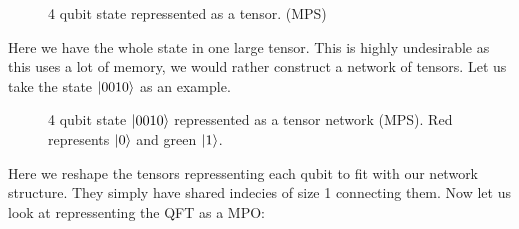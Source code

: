 \begin{figure}[H]
    \centering 
    \caption{4 qubit state repressented as a tensor. (MPS)}
    \label{fig:psi4t}
\end{figure}
\noindent
Here we have the whole state in one large tensor. This is highly undesirable as this uses a lot of memory, we would rather construct a network of tensors. Let us take the state $\ket{0010}$ as an example.
\begin{figure}[H]
    \centering 
    \caption{4 qubit state $\ket{0010}$ repressented as a tensor network (MPS). Red represents $\ket{0}$ and green $\ket{1}$. }
    \label{fig:psi4t_mps}
\end{figure}
\noindent
Here we reshape the tensors repressenting each qubit to fit with our network structure. They simply have shared indecies of size 1 connecting them. 
Now let us look at repressenting the QFT as a MPO:
